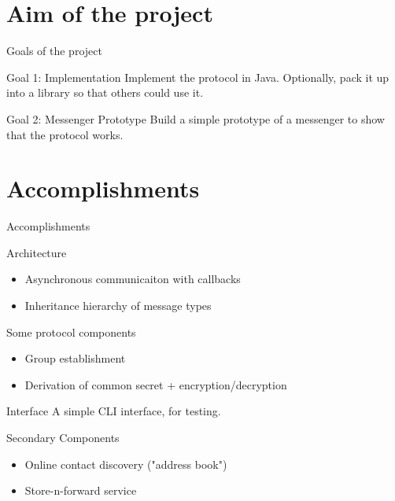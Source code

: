 \documentclass{beamer}
\begin{document}
\section{Aim of the project}
\begin{frame}{Goals of the project}
    \begin{block}{Goal 1: Implementation}
        Implement the protocol in Java. Optionally, pack it up into a library so that others could use it.
    \end{block}
    \begin{block}{Goal 2: Messenger Prototype}
        Build a simple prototype of a messenger to show that the protocol works.
    \end{block}
\end{frame}

\section{Accomplishments}
\begin{frame}{Accomplishments}
    \begin{block}{Architecture}
            \begin{itemize}
                \item Asynchronous communicaiton with callbacks
                \item Inheritance hierarchy of message types
            \end{itemize}
    \end{block}
    \begin{block}{Some protocol components}
        \begin{itemize}
            \item Group establishment
            \item Derivation of common secret + encryption/decryption
        \end{itemize}
    \end{block}
    \begin{block}{Interface}
        A simple CLI interface, for testing.
    \end{block}
    \begin{block}{Secondary Components}
        \begin{itemize}
            \item Online contact discovery ("address book")
            \item Store-n-forward service
        \end{itemize}
    \end{block}
\end{frame}
\end{document}
